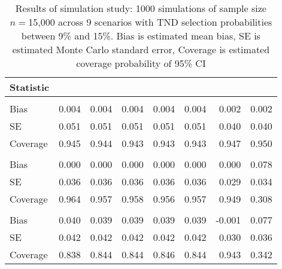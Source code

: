 \begin{table}

\caption{Results of simulation study: 1000 simulations of sample size $n=$15,000 across 9 scenarios with TND selection probabilities between 9\% and 15\%. Bias is estimated mean bias, SE is estimated Monte Carlo standard error, Coverage is estimated coverage probability of 95\% CI}\label{tab:sims}
\centering
\begin{tabular}[t]{lddddddd}
\toprule
Statistic &   &   &   &  &  &  &  \\
\midrule
\addlinespace[0.3em]
\\
\hspace{1em}Bias & 0.004 & 0.004 & 0.004 & 0.004 & 0.004 & 0.002 & 0.002\\
\hspace{1em}SE & 0.051 & 0.051 & 0.051 & 0.051 & 0.051 & 0.040 & 0.040\\
\hspace{1em}Coverage & 0.945 & 0.944 & 0.943 & 0.943 & 0.943 & 0.947 & 0.950\\
\addlinespace[0.3em]
\\
\hspace{1em}Bias & 0.000 & 0.000 & 0.000 & 0.000 & 0.000 & 0.000 & 0.078\\
\hspace{1em}SE & 0.036 & 0.036 & 0.036 & 0.036 & 0.036 & 0.029 & 0.034\\
\hspace{1em}Coverage & 0.964 & 0.957 & 0.958 & 0.956 & 0.957 & 0.949 & 0.308\\
\addlinespace[0.3em]
\\
\hspace{1em}Bias & 0.040 & 0.039 & 0.039 & 0.039 & 0.039 & -0.001 & 0.077\\
\hspace{1em}SE & 0.042 & 0.042 & 0.042 & 0.042 & 0.042 & 0.030 & 0.036\\
\hspace{1em}Coverage & 0.838 & 0.844 & 0.844 & 0.846 & 0.844 & 0.943 & 0.342\\

\end{tabular}
\end{table}
